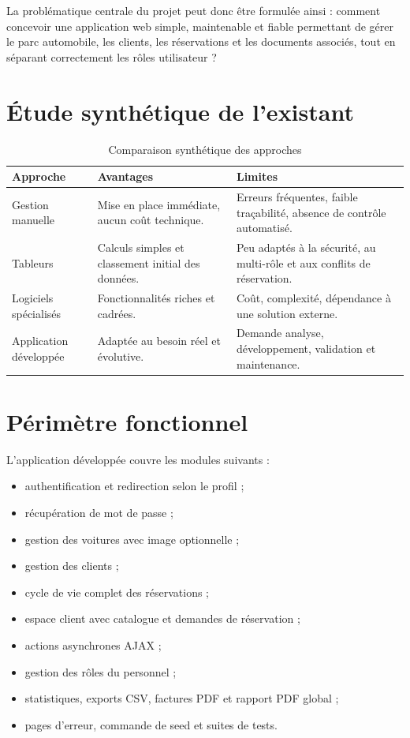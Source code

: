 La problématique centrale du projet peut donc être formulée ainsi : comment concevoir une application web simple, maintenable et fiable permettant de gérer le parc automobile, les clients, les réservations et les documents associés, tout en séparant correctement les rôles utilisateur ?

\section{Étude synthétique de l'existant}

\begin{table}[H]
\centering
\caption{Comparaison synthétique des approches}
\begin{tabularx}{\textwidth}{|l|X|X|}
\hline
\textbf{Approche} & \textbf{Avantages} & \textbf{Limites} \\
\hline
Gestion manuelle & Mise en place immédiate, aucun coût technique. & Erreurs fréquentes, faible traçabilité, absence de contrôle automatisé. \\
\hline
Tableurs & Calculs simples et classement initial des données. & Peu adaptés à la sécurité, au multi-rôle et aux conflits de réservation. \\
\hline
Logiciels spécialisés & Fonctionnalités riches et cadrées. & Coût, complexité, dépendance à une solution externe. \\
\hline
Application développée & Adaptée au besoin réel et évolutive. & Demande analyse, développement, validation et maintenance. \\
\hline
\end{tabularx}
\end{table}

\section{Périmètre fonctionnel}
L'application développée couvre les modules suivants :
\begin{itemize}
  \item authentification et redirection selon le profil ;
  \item récupération de mot de passe ;
  \item gestion des voitures avec image optionnelle ;
  \item gestion des clients ;
  \item cycle de vie complet des réservations ;
  \item espace client avec catalogue et demandes de réservation ;
  \item actions asynchrones AJAX ;
  \item gestion des rôles du personnel ;
  \item statistiques, exports CSV, factures PDF et rapport PDF global ;
  \item pages d'erreur, commande de seed et suites de tests.
\end{itemize}

